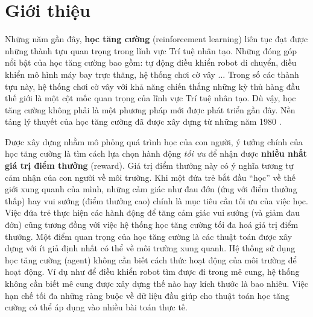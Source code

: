 \chapter{Giới thiệu}

\ifpdf
\graphicspath{{Chapter1/Chapter1Figs/PNG/}{Chapter1/Chapter1Figs/PDF/}{Chapter1/Chapter1Figs/}}
\else
\graphicspath{{Chapter1/Chapter1Figs/EPS/}{Chapter1/Chapter1Figs/}}
\fi

Những năm gần đây, \textbf{học tăng cường} (reinforcement learning) liên tục đạt được những thành tựu quan trọng trong lĩnh vực Trí tuệ nhân tạo. 
Những đóng góp nổi bật của học tăng cường bao gồm: tự động điều khiển robot di chuyển, điều khiển mô hình máy bay trực thăng, hệ thống chơi cờ vây ... 
Trong số các thành tựu này, hệ thống chơi cờ vây với khả năng chiến thắng những kỳ thủ hàng đầu thế giới là một cột mốc quan trọng của lĩnh vực Trí tuệ nhân tạo. 
Dù vậy, học tăng cường không phải là một phương pháp mới được phát triển gần đây.
Nền tảng lý thuyết của học tăng cường đã được xây dựng từ những năm 1980 \cite{sutton1998introduction}.

Được xây dựng nhằm mô phỏng quá trình học của con người, ý tưởng chính của học tăng cường là tìm cách lựa chọn hành động \textit{tối ưu} để nhận được \textbf{nhiều nhất giá trị điểm thưởng} (reward). 
Giá trị điểm thưởng này có ý nghĩa tương tự cảm nhận của con người về môi trường. 
Khi một đứa trẻ bắt đầu ``học'' về thế giới xung quanh của mình, những cảm giác như đau đớn (ứng với điểm thưởng thấp) hay vui sướng (điểm thưởng cao) chính là mục tiêu cần tối ưu của việc học. 
Việc đứa trẻ thực hiện các hành động để tăng cảm giác vui sướng (và giảm đau đớn) cũng tương đồng với việc hệ thống học tăng cường tối đa hoá giá trị điểm thưởng.
Một điểm quan trọng của học tăng cường là các thuật toán được xây dựng với ít giả định nhất có thể về môi trường xung quanh.
Hệ thống sử dụng học tăng cường (agent) không cần biết cách thức hoạt động của môi trường để hoạt động. 
Ví dụ như để điều khiển robot tìm được đi trong mê cung, hệ thống không cần biết mê cung được xây dựng thế nào hay kích thước là bao nhiêu. 
Việc hạn chế tối đa những ràng buộc về dữ liệu đầu giúp cho thuật toán học tăng cường có thể áp dụng vào nhiều bài toán thực tế.

